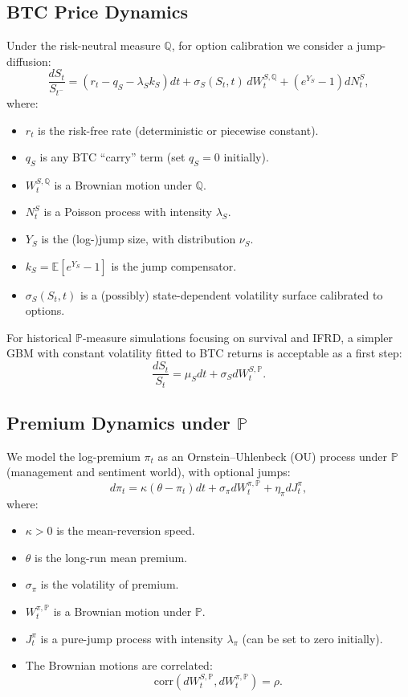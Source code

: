 \documentclass[11pt]{article}
\begin{document}
\subsection{BTC Price Dynamics}

Under the risk-neutral measure $\mathbb Q$, for option calibration we consider a jump-diffusion:
$$
  \frac{dS_t}{S_{t^-}} =
  \left(r_t - q_S - \lambda_S k_S \right) dt
  + \sigma_S(S_t,t)\,dW_t^{S,\mathbb Q}
  + \left(e^{Y_S} - 1 \right) dN_t^S,
$$
where:
\begin{itemize}
  \item $r_t$ is the risk-free rate (deterministic or piecewise constant).
  \item $q_S$ is any BTC ``carry'' term (set $q_S = 0$ initially).
  \item $W_t^{S,\mathbb Q}$ is a Brownian motion under $\mathbb Q$.
  \item $N_t^S$ is a Poisson process with intensity $\lambda_S$.
  \item $Y_S$ is the (log-)jump size, with distribution $\nu_S$.
  \item $k_S = \mathbb E[e^{Y_S}-1]$ is the jump compensator.
  \item $\sigma_S(S_t,t)$ is a (possibly) state-dependent volatility surface calibrated to options.
\end{itemize}

For historical $\mathbb P$-measure simulations focusing on survival and IFRD, a simpler GBM with constant volatility fitted to BTC returns is acceptable as a first step:
$$
  \frac{dS_t}{S_t} = \mu_S dt + \sigma_S dW_t^{S,\mathbb P}.
$$

\subsection{Premium Dynamics under $\mathbb P$}

We model the log-premium $\pi_t$ as an Ornstein--Uhlenbeck (OU) process under $\mathbb P$ (management and sentiment world), with optional jumps:
$$
  d\pi_t = \kappa(\theta - \pi_t) dt
           + \sigma_\pi dW_t^{\pi,\mathbb P}
           + \eta_\pi dJ_t^\pi,
$$
where:
\begin{itemize}
  \item $\kappa > 0$ is the mean-reversion speed.
  \item $\theta$ is the long-run mean premium.
  \item $\sigma_\pi$ is the volatility of premium.
  \item $W_t^{\pi,\mathbb P}$ is a Brownian motion under $\mathbb P$.
  \item $J_t^\pi$ is a pure-jump process with intensity $\lambda_\pi$ (can be set to zero initially).
  \item The Brownian motions are correlated:
  $$
    \text{corr}(dW_t^{S,\mathbb P}, dW_t^{\pi,\mathbb P}) = \rho.
  $$
\end{itemize}
\end{document}
